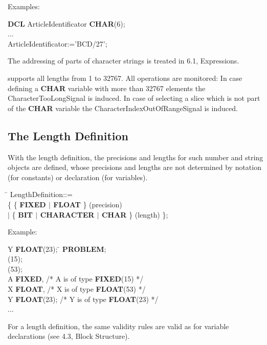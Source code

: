 Examples:

{\bf DCL} ArticleIdentificator {\bf CHAR}(6);\\
...\\
ArticleIdentificator:='BCD/27';

The addressing of parts of character strings is treated in 6.1,
Expressions.

\begin{added}
\OpenPEARL{} supports all lengths from 1 to 32767.
All operations are monitored:
In case defining a {\bf CHAR} variable with more than 32767 elements the
CharacterTooLongSignal is induced.
In case of selecting a slice which is not part of the {\bf CHAR} variable the 
CharacterIndexOutOfRangeSignal is induced.
\end{added}

\begin{tobedone}
\section{The Length Definition}   %

With the length definition, the precisions and lengths for such
number and string objects are defined, whose precisions and lengths are
not determined by notation (for constants) or declaration (for
variables).

\begin{tabbing}
 \= \kill
LengthDefinition::=\\
 \{ \{ {\bf FIXED $\mid$ FLOAT} \} (precision)\\
              \x \> $\mid$ \{ {\bf BIT $\mid$ CHARACTER $\mid$ CHAR} \} (length) \};
\end{tabbing}

Example:

\begin{tabbing}
\x \x Y {\bf FLOAT}(23); \x \= \kill
{\bf PROBLEM}; \> \\
(15); \> \\
(53); \> \\
 A {\bf FIXED}, \> /* A is of type {\bf FIXED}(15) */ \\
\x \x X {\bf FLOAT},        \> /* X is of type {\bf FLOAT}(53) */ \\
\x \x Y {\bf FLOAT}(23);    \> /* Y is of type {\bf FLOAT}(23) */ \\
\x ... \> \\
\end{tabbing}

For a length definition, the same validity rules are valid as for
variable declarations (see 4.3, Block Structure).
\end{tobedone}

